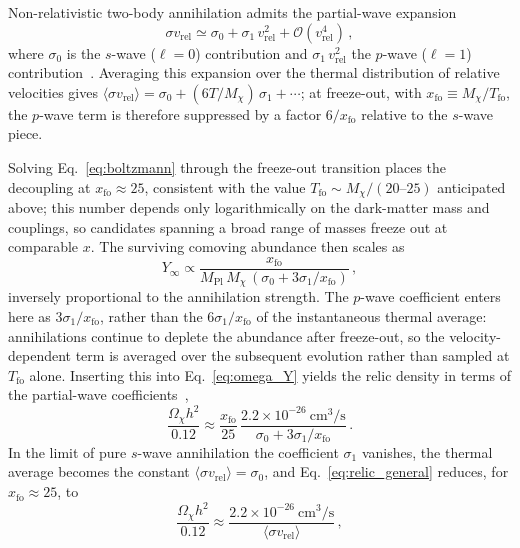 Non-relativistic two-body annihilation admits the partial-wave expansion
\begin{equation}
	\sigma v_\mathrm{rel} \simeq \sigma_0 + \sigma_1\, v_\mathrm{rel}^2 + \mathcal{O}(v_\mathrm{rel}^4)\,,
	\label{eq:partial_wave}
\end{equation}
where $\sigma_0$ is the $s$-wave ($\ell=0$) contribution and $\sigma_1\, v_\mathrm{rel}^2$ the $p$-wave ($\ell=1$) contribution~\cite{Cirelli:2024ssz}.
Averaging this expansion over the thermal distribution of relative velocities gives $\langle \sigma v_\mathrm{rel}\rangle = \sigma_0 + (6T/M_\chi)\,\sigma_1 + \cdots$; at freeze-out, with $x_\mathrm{fo} \equiv M_\chi/T_\mathrm{fo}$, the $p$-wave term is therefore suppressed by a factor $6/x_\mathrm{fo}$ relative to the $s$-wave piece.

Solving Eq.~\eqref{eq:boltzmann} through the freeze-out transition places the decoupling at $x_\mathrm{fo} \approx 25$, consistent with the value $T_\mathrm{fo} \sim M_\chi/(20\text{--}25)$ anticipated above; this number depends only logarithmically on the dark-matter mass and couplings, so candidates spanning a broad range of masses freeze out at comparable $x$.
The surviving comoving abundance then scales as
\[
	Y_\infty \propto \frac{x_\mathrm{fo}}{M_\mathrm{Pl}\, M_\chi\, (\sigma_0 + 3\sigma_1/x_\mathrm{fo})}\,,
\]
inversely proportional to the annihilation strength.
The $p$-wave coefficient enters here as $3\sigma_1/x_\mathrm{fo}$, rather than the $6\sigma_1/x_\mathrm{fo}$ of the instantaneous thermal average: annihilations continue to deplete the abundance after freeze-out, so the velocity-dependent term is averaged over the subsequent evolution rather than sampled at $T_\mathrm{fo}$ alone.
Inserting this into Eq.~\eqref{eq:omega_Y} yields the relic density in terms of the partial-wave coefficients~\cite{Steigman:2012nb},
\begin{equation}
	\frac{\Omega_\chi h^2}{0.12} \approx \frac{x_\mathrm{fo}}{25}\,\frac{2.2\times 10^{-26}~\mathrm{cm^3/s}}{\sigma_0 + 3\sigma_1/x_\mathrm{fo}}\,.
	\label{eq:relic_general}
\end{equation}
In the limit of pure $s$-wave annihilation the coefficient $\sigma_1$ vanishes, the thermal average becomes the constant $\langle \sigma v_\mathrm{rel}\rangle = \sigma_0$, and Eq.~\eqref{eq:relic_general} reduces, for $x_\mathrm{fo}\approx 25$, to
\begin{equation}
	\frac{\Omega_\chi h^2}{0.12} \approx \frac{2.2 \times 10^{-26}~\mathrm{cm^3/s}}{\langle \sigma v_\mathrm{rel}\rangle}\,,
	\label{eq:relic_abundance}
\end{equation}
